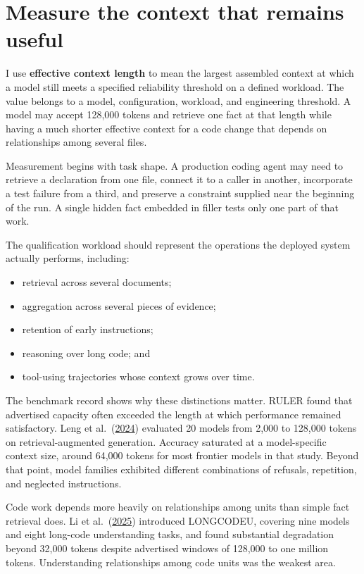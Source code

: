 \section{Measure the context that remains useful}\label{measure-the-context-that-remains-useful}

I use \textbf{effective context length} to mean the largest assembled context at which a model still meets a specified reliability threshold on a defined workload. The value belongs to a model, configuration, workload, and engineering threshold. A model may accept 128,000 tokens and retrieve one fact at that length while having a much shorter effective context for a code change that depends on relationships among several files.

Measurement begins with task shape. A production coding agent may need to retrieve a declaration from one file, connect it to a caller in another, incorporate a test failure from a third, and preserve a constraint supplied near the beginning of the run. A single hidden fact embedded in filler tests only one part of that work.

The qualification workload should represent the operations the deployed system actually performs, including:

\begin{itemize}
\tightlist
\item
  retrieval across several documents;
\item
  aggregation across several pieces of evidence;
\item
  retention of early instructions;
\item
  reasoning over long code; and
\item
  tool-using trajectories whose context grows over time.
\end{itemize}

The benchmark record shows why these distinctions matter. RULER found that advertised capacity often exceeded the length at which performance remained satisfactory. Leng et al.~(\href{https://arxiv.org/abs/2411.03538}{2024}) evaluated 20 models from 2,000 to 128,000 tokens on retrieval-augmented generation. Accuracy saturated at a model-specific context size, around 64,000 tokens for most frontier models in that study. Beyond that point, model families exhibited different combinations of refusals, repetition, and neglected instructions.

Code work depends more heavily on relationships among units than simple fact retrieval does. Li et al.~(\href{https://arxiv.org/abs/2503.04359}{2025}) introduced LONGCODEU, covering nine models and eight long-code understanding tasks, and found substantial degradation beyond 32,000 tokens despite advertised windows of 128,000 to one million tokens. Understanding relationships among code units was the weakest area.

